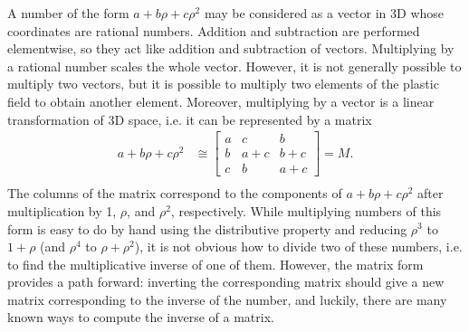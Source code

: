 \documentclass{article}
\begin{document}
A number of the form $a+b\rho+c\rho^2$
may be considered as a vector in 3D
whose coordinates are rational numbers.
Addition and subtraction are performed elementwise,
so they act like addition and subtraction of vectors.
Multiplying by a rational number scales the whole vector.
However, it is not generally possible to multiply two vectors,
but it is possible to multiply two elements of the plastic field
to obtain another element.
Moreover, multiplying by a vector is a linear transformation of 3D space,
i.e. it can be represented by a matrix
\begin{align*}
  a+b\rho+c\rho^2 &\cong
  \begin{bmatrix}
    a & c & b \\
    b & a+c & b+c \\
    c & b & a+c
  \end{bmatrix} = M. \\
\end{align*}
The columns of the matrix correspond to the components of
$a+b\rho+c\rho^2$ after multiplication by 1, $\rho$, and $\rho^2$, respectively.
While multiplying numbers of this form is easy to do by hand
using the distributive property and reducing $\rho^3$ to $1+\rho$
(and $\rho^4$ to $\rho+\rho^2$),
it is not obvious how to divide two of these numbers,
i.e. to find the multiplicative inverse of one of them.
However, the matrix form provides a path forward:
inverting the corresponding matrix should give a new matrix
corresponding to the inverse of the number,
and luckily, there are many known ways to compute the inverse of a matrix.
\end{document}
